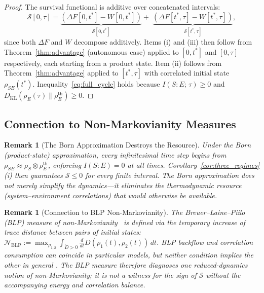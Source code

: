 \documentclass[12pt]{article}
\newtheorem{remark}[theorem]{Remark}
\begin{document}
\begin{proof}
The survival functional is additive over concatenated
intervals:
\[
\mathcal{S}[0,\tau]
= \underbrace{(\Delta F[0,t^*] - W[0,t^*])}_{\mathcal{S}[0,t^*]}
  +\; \underbrace{(\Delta F[t^*,\tau] - W[t^*,\tau])}_{\mathcal{S}[t^*,\tau]},
\]
since both $\Delta F$ and $W$ decompose additively.
Items (i) and (iii) then follow from
Theorem~\ref{thm:advantage} (autonomous case) applied to
$[0,t^*]$ and $[0,\tau]$ respectively, each starting from
a product state.
Item (ii) follows from Theorem~\ref{thm:advantage} applied
to $[t^*,\tau]$ with correlated initial state
$\rho_{SE}(t^*)$.
Inequality~\eqref{eq:full_cycle} holds because
$I(S{:}E;\,\tau) \geq 0$ and
$D_{\mathrm{KL}}(\rho_E(\tau)\|\rho_E^{\mathrm{th}}) \geq 0$.
\end{proof}

\subsection{Connection to Non-Markovianity Measures}

\begin{remark}[The Born Approximation Destroys the Resource]
\label{rem:born_kills}
Under the Born (product-state) approximation, every
infinitesimal time step begins from
$\rho_{SE} \approx \rho_S \otimes \rho_E^{\mathrm{th}}$,
enforcing $I(S{:}E) = 0$ at all times.
Corollary~\ref{cor:three_regimes}(i) then guarantees
$\mathcal{S} \leq 0$ for \emph{every} finite interval.
The Born approximation does not merely simplify the
dynamics---it \emph{eliminates the thermodynamic resource}
(system--environment correlations) that would otherwise be
available.
\end{remark}

\begin{remark}[Connection to BLP Non-Markovianity]
\label{rem:BLP}
The Breuer--Laine--Piilo (BLP) measure of
non-Markovianity~\cite{BreuerLainePiilo2009} is defined via
the temporary increase of trace distance between pairs of
initial states:
$\mathcal{N}_{\mathrm{BLP}} := \max_{\rho_{1,2}}
\int_{\dot{D}>0} \frac{d}{dt}
D(\rho_1(t),\rho_2(t))\, dt$.
BLP backflow and correlation consumption can coincide in particular
models, but neither condition implies the other in general
\cite{RivasHuelgaPlenio2014}.  The BLP measure therefore diagnoses one
reduced-dynamics notion of non-Markovianity; it is not a witness for the
sign of $\mathcal S$ without the accompanying energy and correlation
balance.
\end{remark}
\end{document}
